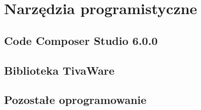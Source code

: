\section{Narzędzia programistyczne}
\subsection{Code Composer Studio 6.0.0}
\subsection{Biblioteka TivaWare}
\subsection{Pozostałe oprogramowanie}




